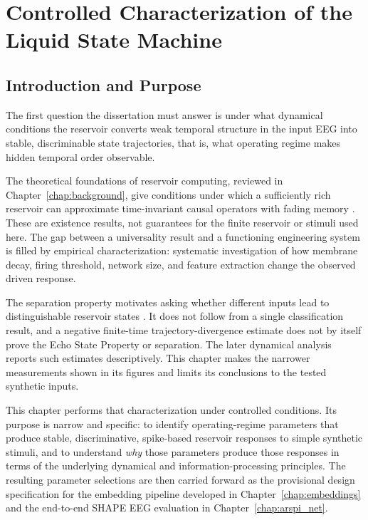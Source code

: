\chapter{Controlled Characterization of the Liquid State Machine}
\label{chap:lsm}

\section{Introduction and Purpose}
\label{sec:ch3_intro}

The first question the dissertation must answer is under what dynamical conditions the reservoir converts weak temporal structure in the input EEG into stable, discriminable state trajectories, that is, what operating regime makes hidden temporal order observable.

The theoretical foundations of reservoir computing, reviewed in Chapter~\ref{chap:background}, give conditions under which a sufficiently rich reservoir can approximate time-invariant causal operators with fading memory \cite{Maass2002RealTime,boyd_chua_1985}. These are existence results, not guarantees for the finite reservoir or stimuli used here. The gap between a universality result and a functioning engineering system is filled by empirical characterization: systematic investigation of how membrane decay, firing threshold, network size, and feature extraction change the observed driven response.

The separation property motivates asking whether different inputs lead to distinguishable reservoir states \cite{Maass2002RealTime}. It does not follow from a single classification result, and a negative finite-time trajectory-divergence estimate does not by itself prove the Echo State Property or separation. The later dynamical analysis reports such estimates descriptively. This chapter makes the narrower measurements shown in its figures and limits its conclusions to the tested synthetic inputs.

This chapter performs that characterization under controlled conditions. Its purpose is narrow and specific: to identify operating-regime parameters that produce stable, discriminative, spike-based reservoir responses to simple synthetic stimuli, and to understand \emph{why} those parameters produce those responses in terms of the underlying dynamical and information-processing principles. The resulting parameter selections are then carried forward as the provisional design specification for the embedding pipeline developed in Chapter~\ref{chap:embeddings} and the end-to-end SHAPE EEG evaluation in Chapter~\ref{chap:arspi_net}.

